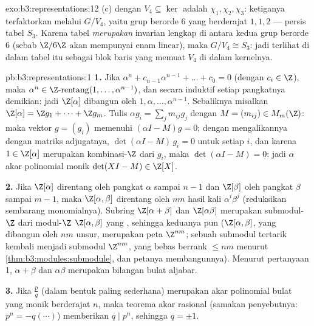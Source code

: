 \begin{solution}{exo:b3:representations:12}
(c)  dengan $V_4 \subseteq \ker$ adalah $\chi_1,
\chi_2, \chi_3$: ketiganya terfaktorkan melalui $G/V_4$, yaitu grup
berorde $6$ yang berderajat  $1, 1, 2$ --- persis
tabel $S_3$. Karena tabel  \emph{merupakan}
invarian lengkap di antara kedua grup berorde $6$
(sebab $\Z/6\Z$ akan mempunyai enam  linear), maka $G/V_4 \cong
S_3$: jadi  terlihat di dalam tabel itu sebagai blok
baris yang memuat $V_4$ di dalam kernelnya.
\end{solution}

\begin{solution}{pb:b3:representations:1}
\textbf{1.} Jika $\alpha^n + c_{n-1}\alpha^{n-1} + \dots + c_0 =
0$ (dengan $c_i \in \Z$), maka $\alpha^n \in \Z\text{-rentang}(1, \dots,
\alpha^{n-1})$, dan secara induktif setiap pangkatnya demikian: jadi $\Z[\alpha]$
dibangun oleh $1, \alpha, \dots, \alpha^{n-1}$. Sebaliknya misalkan
$\Z[\alpha] = \Z g_1 + \dots + \Z g_m$. Tulis $\alpha g_i =
\sum_j m_{ij}g_j$ dengan $M = (m_{ij}) \in M_m(\Z)$: maka vektor
$g = (g_i)$ memenuhi $(\alpha I - M)g = 0$; dengan mengalikannya dengan
matriks adjugatnya, $\det(\alpha I - M)\,g_i = 0$ untuk setiap $i$,
dan karena $1 \in \Z[\alpha]$ merupakan kombinasi-$\Z$ dari
$g_i$, maka $\det(\alpha I - M) = 0$: jadi $\alpha$ akar polinomial
monik $\det(XI - M) \in \Z[X]$.

\textbf{2.} Jika $\Z[\alpha]$ direntang oleh pangkat $\alpha$ sampai
$n-1$ dan $\Z[\beta]$ oleh pangkat $\beta$ sampai $m - 1$, maka
$\Z[\alpha,\beta]$ direntang oleh $nm$ hasil kali
$\alpha^i\beta^j$ (reduksikan sembarang monomialnya). Subring
$\Z[\alpha + \beta]$ dan $\Z[\alpha\beta]$ merupakan submodul-$\Z$
dari modul-$\Z$ $\Z[\alpha, \beta]$ yang ,
sehingga keduanya pun  ($\Z[\alpha,\beta]$, yang dibangun oleh
$nm$ unsur, merupakan peta $\Z^{nm}$; sebuah submodul tertarik
kembali menjadi submodul $\Z^{nm}$, yang bebas berrank $\leq nm$ menurut
\cref{thm:b3:modules:submodule}, dan petanya membangunnya). Menurut
pertanyaan 1, $\alpha + \beta$ dan $\alpha\beta$ merupakan bilangan bulat
aljabar.

\textbf{3.} Jika $\frac pq$ (dalam bentuk paling sederhana) merupakan akar polinomial
bulat yang monik berderajat $n$, maka teorema akar rasional
(samakan penyebutnya: $p^n = -q(\cdots)$) memberikan $q \mid p^n$,
sehingga $q = \pm1$.


\end{solution}
